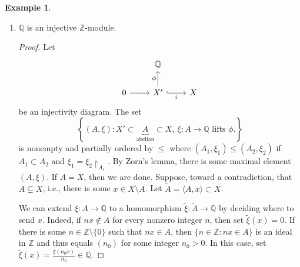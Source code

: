 \documentclass[10pt,letterpaper,cm]{nupset}
\theoremstyle{definition}
\newtheorem{exmp}[definition]{Example}
\theoremstyle{theorem}
\theoremstyle{remark}
\newcommand{\Q}{\mathbb Q}
\newcommand{\Z}{\mathbb Z}
\newcommand{\1}{\mathbf{1}}
\newcommand{\0}{\vec 0}
\begin{document}
\begin{exmp} $ $
\begin{enumerate}
\item $\Q$ is an injective $\Z$-module.
\begin{proof}
Let \[
\begin{tikzcd}
 & \Q &  \\
0 \arrow[r] & X' \arrow[r, "i"', hook] \arrow[u, "\phi"] & X
\end{tikzcd}
\] be an injectivity diagram. The set $$\left\{ (A, \xi) : X' \subset \underbrace{A}_{\text{abelian}} \subset X, \ \xi : A \to \Q \text{ lifts } \phi.  \right\}$$ is nonempty and partially ordered  by $\leq$ where $(A_1, \xi_1) \leq (A_2, \xi_2)$ if $A_1 \subset A_2$ and $\xi_1 = \xi_2\restriction_{A_1}$. By Zorn's lemma, there is some maximal element $(A, \xi)$. If $A = X$, then we are done. Suppose, toward a contradiction, that $A \subsetneq X$, i.e., there is some $x\in X \setminus A$. Let $\tilde{A} = \langle A, x\rangle \subset X$. 

We can extend $\xi : A \to \Q$ to a homomorphism $\tilde{\xi} : \tilde{A} \to \Q$ by deciding where to send $x$. Indeed, if $nx \notin A$ for every nonzero integer $n$, then set $\tilde{\xi}(x) = 0$. If there is some $n\in \Z \setminus \{0\}$ such that $nx \in A$, then $\{n \in \Z : nx \in A\}$ is an ideal in $\Z$ and thus equals $(n_0)$ for some integer $n_0 >0$. In this case, set $\tilde{\xi}(x) = \frac{\xi(n_0x)}{n_0} \in \Q$. 


\end{proof}
\end{enumerate}
\end{exmp}
\end{document}
